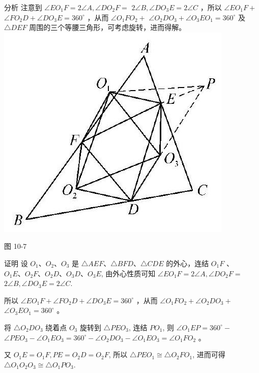 \documentclass[10pt]{article}
\begin{document}
分析 注意到 $\angle E O_{1} F=2 \angle A, \angle D O_{2} F=$ $2 \angle B, \angle D O_{3} E=2 \angle C$ ，所以 $\angle E O_{1} F+$ $\angle F O_{2} D+\angle D O_{3} E=360^{\circ}$ ，从而 $\angle O_{1} F O_{2}+$ $\angle O_{2} D O_{3}+\angle O_{3} E O_{1}=360^{\circ}$ 及 $\triangle D E F$ 周围的三个等腰三角形，可考虑旋转，进而得解。\\
\includegraphics[max width=\textwidth, center]{2024_10_30_66b8e5e701da2093c133g-075(1)}

图 10-7

证明 设 $O_{1} 、 O_{2} 、 O_{3}$ 是 $\triangle A E F 、 \triangle B F D 、 \triangle C D E$ 的外心，连结 $O_{1} F$ 、 $O_{1} E 、 O_{2} F 、 O_{2} D 、 O_{3} D 、 O_{3} E$, 由外心性质可知 $\angle E O_{1} F=2 \angle A, \angle D O_{2} F=$ $2 \angle B, \angle D O_{3} E=2 \angle C$.

所以 $\angle E O_{1} F+\angle F O_{2} D+\angle D O_{3} E=360^{\circ}$ ，从而 $\angle O_{1} F O_{2}+\angle O_{2} D O_{3}+$ $\angle O_{3} E O_{1}=360^{\circ}$ 。

将 $\triangle O_{2} D O_{3}$ 绕着点 $O_{3}$ 旋转到 $\triangle P E O_{3}$, 连结 $P O_{1}$, 则 $\angle O_{1} E P=360^{\circ}-$ $\angle P E O_{3}-\angle O_{1} E O_{3}=360^{\circ}-\angle O_{2} D O_{3}-\angle O_{1} E O_{3}=\angle O_{1} F O_{2}$ 。

又 $O_{1} E=O_{1} F, P E=O_{2} D=O_{2} F$, 所以 $\triangle P E O_{1} \cong \triangle O_{2} F O_{1}$, 进而可得 $\triangle O_{1} O_{2} O_{3} \cong \triangle O_{1} P O_{3}$.
\end{document}
